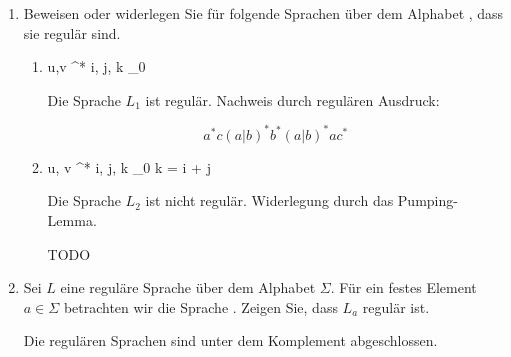 \documentclass{bschlangaul-aufgabe}
\begin{document}
\begin{enumerate}
\begin{bAntwort}
\end{bAntwort}


\item Beweisen oder widerlegen Sie für folgende Sprachen über dem
Alphabet , dass sie regulär sind.

\begin{enumerate}


\item {}
{u,v \in {}^*  i, j, k \in {}_0}

\begin{bAntwort}
Die Sprache $L_1$ ist regulär. Nachweis durch regulären Ausdruck:

\begin{displaymath}
a^* c (a|b)^* b^* (a|b)^* a c^*
\end{displaymath}
\end{bAntwort}


\item {}
{u, v \in {}^*  i, j, k \in {}_0 k = i + j}

\begin{bAntwort}
Die Sprache $L_2$ ist nicht regulär. Widerlegung durch das Pumping-Lemma.

TODO
\end{bAntwort}

\end{enumerate}


\item Sei $L$ eine reguläre Sprache über dem Alphabet $\Sigma$. Für ein
festes Element $a \in \Sigma$ betrachten wir die Sprache
. Zeigen Sie, dass $L_a$
regulär ist.

\begin{bAntwort}
Die regulären Sprachen sind unter dem Komplement abgeschlossen.
\end{bAntwort}
\end{enumerate}
\end{document}
